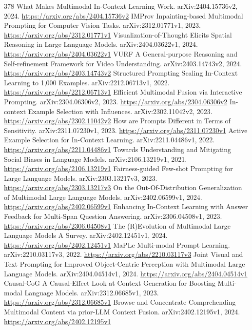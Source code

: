 \documentclass[11pt]{article}
\begin{document}
\begin{thebibliography}{378}
 What Makes Multimodal In-Context Learning Work. arXiv:2404.15736v2, 2024. \url{https://arxiv.org/abs/2404.15736v2}
 IMProv Inpainting-based Multimodal Prompting for Computer Vision Tasks. arXiv:2312.01771v1, 2023. \url{https://arxiv.org/abs/2312.01771v1}
 Visualization-of-Thought Elicits Spatial Reasoning in Large Language Models. arXiv:2404.03622v1, 2024. \url{https://arxiv.org/abs/2404.03622v1}
 VURF A General-purpose Reasoning and Self-refinement Framework for Video Understanding. arXiv:2403.14743v2, 2024. \url{https://arxiv.org/abs/2403.14743v2}
 Structured Prompting Scaling In-Context Learning to 1,000 Examples. arXiv:2212.06713v1, 2022. \url{https://arxiv.org/abs/2212.06713v1}
 Efficient Multimodal Fusion via Interactive Prompting. arXiv:2304.06306v2, 2023. \url{https://arxiv.org/abs/2304.06306v2}
 In-context Example Selection with Influences. arXiv:2302.11042v2, 2023. \url{https://arxiv.org/abs/2302.11042v2}
 How are Prompts Different in Terms of Sensitivity. arXiv:2311.07230v1, 2023. \url{https://arxiv.org/abs/2311.07230v1}
 Active Example Selection for In-Context Learning. arXiv:2211.04486v1, 2022. \url{https://arxiv.org/abs/2211.04486v1}
 Towards Understanding and Mitigating Social Biases in Language Models. arXiv:2106.13219v1, 2021. \url{https://arxiv.org/abs/2106.13219v1}
 Fairness-guided Few-shot Prompting for Large Language Models. arXiv:2303.13217v3, 2023. \url{https://arxiv.org/abs/2303.13217v3}
 On the Out-Of-Distribution Generalization of Multimodal Large Language Models. arXiv:2402.06599v1, 2024. \url{https://arxiv.org/abs/2402.06599v1}
 Enhancing In-Context Learning with Answer Feedback for Multi-Span Question Answering. arXiv:2306.04508v1, 2023. \url{https://arxiv.org/abs/2306.04508v1}
 The (R)Evolution of Multimodal Large Language Models A Survey. arXiv:2402.12451v1, 2024. \url{https://arxiv.org/abs/2402.12451v1}
 MaPLe Multi-modal Prompt Learning. arXiv:2210.03117v3, 2022. \url{https://arxiv.org/abs/2210.03117v3}
 Joint Visual and Text Prompting for Improved Object-Centric Perception with Multimodal Large Language Models. arXiv:2404.04514v1, 2024. \url{https://arxiv.org/abs/2404.04514v1}
 Causal-CoG A Causal-Effect Look at Context Generation for Boosting Multi-modal Language Models. arXiv:2312.06685v1, 2023. \url{https://arxiv.org/abs/2312.06685v1}
 Browse and Concentrate Comprehending Multimodal Content via prior-LLM Context Fusion. arXiv:2402.12195v1, 2024. \url{https://arxiv.org/abs/2402.12195v1}

\end{thebibliography}
\end{document}
